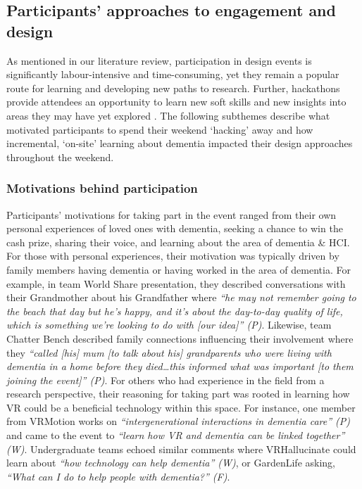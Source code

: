 \subsection{Participants' approaches to engagement and design}
\label{LearningEvent:ThemeOne}
As mentioned in our literature review, participation in design events is significantly labour-intensive and time-consuming, yet they remain a popular route for learning and developing new paths to research. Further, hackathons provide attendees an opportunity to learn new soft skills and new insights into areas they may have yet explored \citep{medina_angarita_what_2020}. The following subthemes describe what motivated participants to spend their weekend ‘hacking’ away and how incremental, ‘on-site’ learning about dementia impacted their design approaches throughout the weekend. 

\subsubsection{Motivations behind participation}
\label{ThemeOne:subthemeOne}
Participants’ motivations for taking part in the event ranged from their own personal experiences of loved ones with dementia, seeking a chance to win the cash prize, sharing their voice, and learning about the area of dementia \& HCI. For those with personal experiences, their motivation was typically driven by family members having dementia or having worked in the area of dementia. For example, in team World Share presentation, they described conversations with their Grandmother about his Grandfather where \textit{“he may not remember going to the beach that day but he’s happy, and it’s about the day-to-day quality of life, which is something we’re looking to do with [our idea]” (P)}. Likewise, team Chatter Bench described family connections influencing their involvement where they \textit{“called [his] mum [to talk about his] grandparents who were living with dementia in a home before they died…this informed what was important [to them joining the event]” (P)}. For others who had experience in the field from a research perspective, their reasoning for taking part was rooted in learning how VR could be a beneficial technology within this space. For instance, one member from VRMotion works on \textit{“intergenerational interactions in dementia care” (P)} and came to the event to \textit{“learn how VR and dementia can be linked together” (W)}. Undergraduate teams echoed similar comments where VRHallucinate could learn about \textit{“how technology can help dementia” (W)}, or GardenLife asking, \textit{“What can I do to help people with dementia?” (F)}. 

